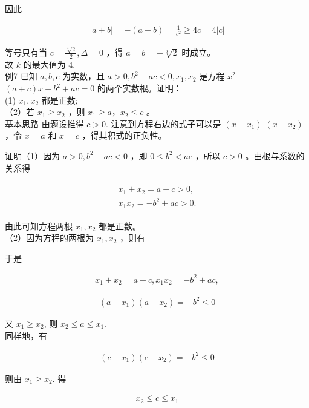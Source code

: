 \documentclass[10pt]{article}
\begin{document}
因此

\begin{align*}
|a+b|=-(a+b)=\frac{1}{c^{2}} \geqslant 4 c=4|c|
\end{align*}

等号只有当 $c=\frac{\sqrt[3]{2}}{2}, \Delta=0$ ，得 $a=b=-\sqrt[3]{2}$ 时成立。\\
故 $k$ 的最大值为 4.\\
例7 已知 $a, b, c$ 为实数，且 $a>0, b^{2}-a c<0, x_{1}, x_{2}$ 是方程 $x^{2}-$ $(a+c) x-b^{2}+a c=0$ 的两个实数根。证明：\\
(1) $x_{1}, x_{2}$ 都是正数;\\
（2）若 $x_{1} \geqslant x_{2}$ ，则 $x_{1} \geqslant a ， x_{2} \leqslant c$ 。\\
基本思路 由题设推得 $c>0$. 注意到方程右边的式子可以是 $\left(x-x_{1}\right)$ $\left(x-x_{2}\right)$ ，令 $x=a$ 和 $x=c$ ，得其积式的正负性。

证明（1）因为 $a>0, b^{2}-a c<0$ ，即 $0 \leqslant b^{2}<a c$ ，所以 $c>0$ 。由根与系数的关系得

\begin{align*}
\begin{gathered}
x_{1}+x_{2}=a+c>0, \\
x_{1} x_{2}=-b^{2}+a c>0 .
\end{gathered}
\end{align*}

由此可知方程两根 $x_{1}, x_{2}$ 都是正数。\\
（2）因为方程的两根为 $x_{1}, x_{2}$ ，则有

于是

\begin{align*}
x_{1}+x_{2}=a+c, x_{1} x_{2}=-b^{2}+a c,
\end{align*}

\begin{align*}
\left(a-x_{1}\right)\left(a-x_{2}\right)=-b^{2} \leqslant 0
\end{align*}

又 $x_{1} \geqslant x_{2}$, 则 $x_{2} \leqslant a \leqslant x_{1}$.\\
同样地，有

\begin{align*}
\left(c-x_{1}\right)\left(c-x_{2}\right)=-b^{2} \leqslant 0
\end{align*}

则由 $x_{1} \geqslant x_{2}$. 得

\begin{align*}
x_{2} \leqslant c \leqslant x_{1}
\end{align*}
\end{document}
